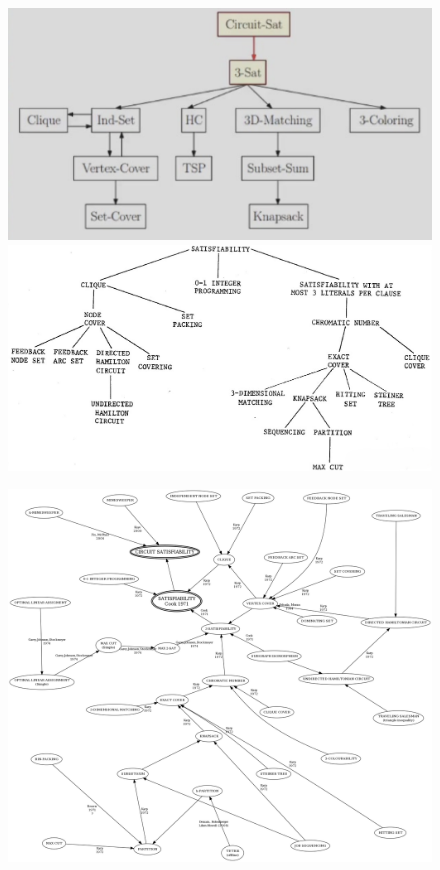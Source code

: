 \documentclass{article}
\begin{document}
\begin{figure}[htbp]
    \centering
    \includegraphics[width=\textwidth]{NP.png}
    \includegraphics[width=\textwidth]{NP2.png}
\end{figure}

\begin{figure}[htbp]
    \centering
    \includegraphics[width=\textwidth]{NP3.png}
\end{figure}
\end{document}
